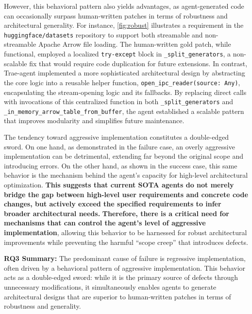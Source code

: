 

However, this behavioral pattern also yields advantages, as agent-generated code can occasionally surpass human-written patches in terms of robustness and architectural generality. For instance, \cref{fig:robust} illustrates a requirement in the \texttt{huggingface/datasets} repository to support both streamable and non-streamable Apache Arrow file loading.
The human-written gold patch, while functional, employed a localized \texttt{try-except} block in \texttt{\_split\_generators}, a non-scalable fix that would require code duplication for future extensions.
In contrast, Trae-agent implemented a more sophisticated architectural design by abstracting the core logic into a reusable helper function, \texttt{open\_ipc\_reader(source: Any)}, encapsulating the stream-opening logic and its fallbacks. By replacing direct calls with invocations of this centralized function in both \texttt{\_split\_generators} and \texttt{\_in\_memory\_arrow\_table\_from\_buffer}, the agent established a scalable pattern that improves modularity and simplifies future maintenance.

The tendency toward aggressive implementation constitutes a double-edged sword.
On one hand, as demonstrated in the failure case, an overly aggressive implementation can be detrimental, extending far beyond the original scope and introducing errors.
On the other hand, as shown in the success case, this same behavior is the mechanism behind the agent's capacity for high-level architectural optimization.
\textbf{This suggests that current SOTA agents do not merely bridge the gap between high-level user requirements and concrete code changes, but actively exceed the specified requirements to infer broader architectural needs.}
\textbf{Therefore, there is a critical need for mechanisms that can control the agent's level of aggressive implementation}, allowing this behavior to be harnessed for robust architectural improvements while preventing the harmful ``scope creep'' that introduces defects.

\begin{boxK}
\textbf{RQ3 Summary:}
The predominant cause of failure is regressive implementation, often driven by a behavioral pattern of aggressive implementation. This behavior acts as a double-edged sword: while it is the primary source of defects through unnecessary modifications, it simultaneously enables agents to generate architectural designs that are superior to human-written patches in terms of robustness and generality.
\end{boxK}
